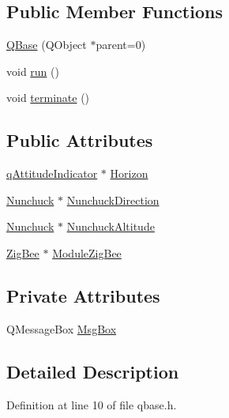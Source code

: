 \subsection*{Public Member Functions}
\begin{DoxyCompactItemize}
\item 
\hyperlink{classQBase_a1951eae68b1eccba818635173cb4eaad}{Q\-Base} (Q\-Object $\ast$parent=0)
\item 
void \hyperlink{classQBase_ac0bbfb1690ac79a226ba59bd7834cdfc}{run} ()
\item 
void \hyperlink{classQBase_a53260534a66388d4b958bd017ebd0f32}{terminate} ()
\end{DoxyCompactItemize}
\subsection*{Public Attributes}
\begin{DoxyCompactItemize}
\item 
\hyperlink{classqAttitudeIndicator}{q\-Attitude\-Indicator} $\ast$ \hyperlink{classQBase_ae4a8b78621695d9a61c311d422824a8d}{Horizon}
\item 
\hyperlink{classNunchuck}{Nunchuck} $\ast$ \hyperlink{classQBase_aa39545ef1795a91bf18db836cde0640d}{Nunchuck\-Direction}
\item 
\hyperlink{classNunchuck}{Nunchuck} $\ast$ \hyperlink{classQBase_a615289f4d92be86986421ec16182ed90}{Nunchuck\-Altitude}
\item 
\hyperlink{classZigBee}{Zig\-Bee} $\ast$ \hyperlink{classQBase_a466b6191fec7cd0029dfc547a5437752}{Module\-Zig\-Bee}
\end{DoxyCompactItemize}
\subsection*{Private Attributes}
\begin{DoxyCompactItemize}
\item 
Q\-Message\-Box \hyperlink{classQBase_aa75e9465559d8633736c52dae36ce1d0}{Msg\-Box}
\end{DoxyCompactItemize}


\subsection{Detailed Description}


Definition at line 10 of file qbase.\-h.



